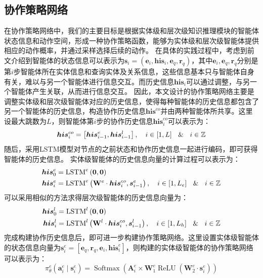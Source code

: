 \documentclass[algorithmlist, AutoFakeBold, AutoFakeSlant, figurelist, tablelist, nomlist, masters]{seuthesix}
\begin{document}
\subsection{协作策略网络}
在协作策略网络中，我们的主要目标是根据实体级和层次级知识推理模块的智能体状态信息和动作空间，形成一种协作策略函数，能够为实体级和层次级智能体提供相应的动作概率，并通过采样选择后续的动作。
在具体的实践过程中，考虑到前文介绍到智能体的状态信息可以表示为$\bm{s}_i = (\bm{e}_i, \bm{his}_i, \bm{e}_q, \bm{r}_q)$，其中$\bm{e}_i, \bm{e}_q, \bm{r}_q$分别是第$i$步智能体所在实体信息和查询实体及关系信息，这些信息基本只与智能体自身有关，难以与另一个智能体进行信息交互。而历史信息$\bm{his}_i$可以通过调整，与另一个智能体产生关联，从而进行信息交互。
因此，本文设计的协作策略网络主要是调整实体级和层次级智能体对应的历史信息，使得每种智能体的历史信息都包含了另一个智能体的历史信息，构造协作历史信息$\bm{his}^{co}$并由两种智能体所共享。这里设最大跳数为$L$，则智能体第$i$步的协作历史信息$\bm{his}_i^{co}$可以表示为：
\begin{equation}
  \bm{his}_{i}^{co} = \left[\bm{his}_{i-1}^e, \bm{his}_{i-1}^l\right], \quad i \in [1, L] \  \And \  i \in \mathbb{Z}
\end{equation}
随后，采用LSTM模型对节点的之前状态和协作历史信息一起进行编码，即可获得智能体的历史信息。
实体级智能体的历史信息向量的计算过程可以表示为：
\begin{equation}
  \begin{aligned}
    \bm{his}_0^e &= \operatorname{LSTM}^e\left(\bm{0}, \bm{0}\right) \\
    \bm{his}_i^e &= \operatorname{LSTM}^e\left(\mathbf{W}^e \cdot \bm{his}_i^{co}, \bm{s}_{i-1}^e\right),\quad i \in [1, L_e] \  \And \  i \in \mathbb{Z}
  \end{aligned}
\end{equation}
可以采用相似的方法求得层次级智能体的历史信息向量为：
\begin{equation}
  \begin{aligned}
    \bm{his}_0^l &=\operatorname{LSTM}^l\left(\bm{0}, \bm{0}\right) \\
    \bm{his}_i^l &= \operatorname{LSTM}^l\left(\mathbf{W}^l \cdot \bm{his}_i^{co}, \bm{s}_{i-1}^l\right),\quad i \in [1, L_h] \  \And \  i \in \mathbb{Z}
  \end{aligned}
\end{equation}
完成构建协作历史信息后，即可进一步构建协作策略网络。这里设置实体级智能体的状态信息向量为$\bm{s}_i^{e} = \left[\bm{e}_q, \bm{r}_q, \bm{e}_i, \bm{his}_i^e\right]$，则构建的实体级智能体的协作策略网络可以表示为：
\begin{equation}
  \pi_\theta^e\left(\bm{a}_i^e \mid \bm{s}_i^e\right) =\operatorname{Softmax}\left(\bm{A}_i^e \times \mathbf{W}_1^e \operatorname{ReLU}\left(\mathbf{W}_2^e \cdot \bm{s}_i^{e}\right)\right)
\end{equation}
\end{document}
